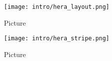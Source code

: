 \lipsum[2-6]

\begin{figure}[th]
	\centering
	\texttt{[image: intro/hera\_layout.png]}
	\caption[HERA Layout]{Picture}
	\label{fig:hera_layout}
\end{figure}


\begin{figure}[th]
	\centering
	\texttt{[image: intro/hera\_stripe.png]}
	\caption[HERA Field of View]{Picture}
	\label{fig:hera_stripe}
\end{figure}
